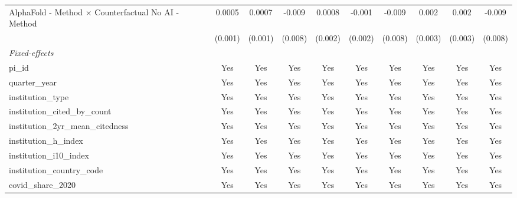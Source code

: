 \begin{tabular}{lccccccccc}
   AlphaFold - Method $\times$ Counterfactual No AI - Method   & 0.0005        & 0.0007        & -0.009        & 0.0008       & -0.001       & -0.009        & 0.002        & 0.002   & -0.009\\   
                                                               & (0.001)       & (0.001)       & (0.008)       & (0.002)      & (0.002)      & (0.008)       & (0.003)      & (0.003) & (0.008)\\   
   \midrule
   \emph{Fixed-effects}\\
   pi\_id                                                      & Yes           & Yes           & Yes           & Yes          & Yes          & Yes           & Yes          & Yes     & Yes\\  
   quarter\_year                                               & Yes           & Yes           & Yes           & Yes          & Yes          & Yes           & Yes          & Yes     & Yes\\  
   institution\_type                                           & Yes           & Yes           & Yes           & Yes          & Yes          & Yes           & Yes          & Yes     & Yes\\  
   institution\_cited\_by\_count                               & Yes           & Yes           & Yes           & Yes          & Yes          & Yes           & Yes          & Yes     & Yes\\  
   institution\_2yr\_mean\_citedness                           & Yes           & Yes           & Yes           & Yes          & Yes          & Yes           & Yes          & Yes     & Yes\\  
   institution\_h\_index                                       & Yes           & Yes           & Yes           & Yes          & Yes          & Yes           & Yes          & Yes     & Yes\\  
   institution\_i10\_index                                     & Yes           & Yes           & Yes           & Yes          & Yes          & Yes           & Yes          & Yes     & Yes\\  
   institution\_country\_code                                  & Yes           & Yes           & Yes           & Yes          & Yes          & Yes           & Yes          & Yes     & Yes\\  
   covid\_share\_2020                                          & Yes           & Yes           & Yes           & Yes          & Yes          & Yes           & Yes          & Yes     & Yes\\  

\end{tabular}
